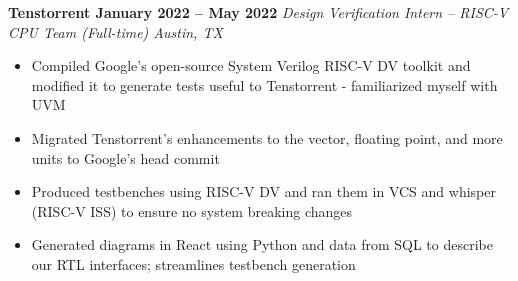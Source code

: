 \documentclass[../main.tex]{subfiles}
\begin{document}
\textbf{{\fontsize{12}{14}\selectfont Tenstorrent \hfill January 2022 – May 2022}}\newline
\emph{Design Verification Intern – RISC-V CPU Team (Full-time) \hfill Austin, TX}\newline
\vspace{-8.5mm}
\begin{itemize}
  \setlength{\itemindent}{-6mm}
  \vspace{-0.2cm}\item {\fontsize{9}{11}\selectfont Compiled Google’s open-source System Verilog RISC-V DV toolkit and modified it to generate tests useful to Tenstorrent - familiarized myself with UVM}
  \vspace{-0.2cm}\item Migrated Tenstorrent’s enhancements to the vector, floating point, and more units to Google’s head commit
  \vspace{-0.2cm}\item Produced testbenches using RISC-V DV and ran them in VCS and whisper (RISC-V ISS) to ensure no system breaking changes
  \vspace{-0.2cm}\item Generated diagrams in React using Python and data from SQL to describe our RTL interfaces; streamlines testbench generation
\end{itemize}
\vspace{-\topsep}
\end{document}
